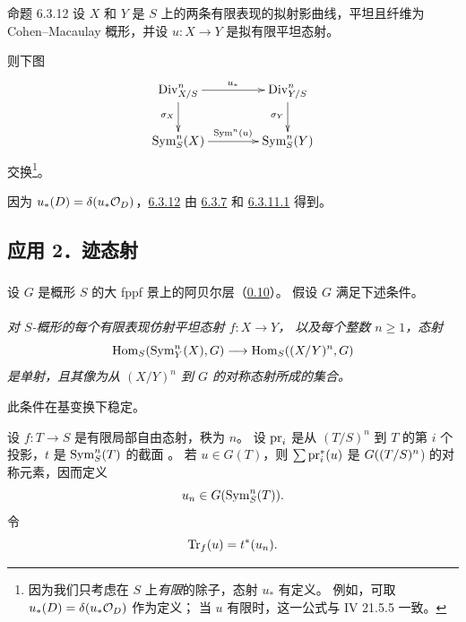 \begin{enonce*}{命题 6.3.12}
设 $X$ 和 $Y$ 是 $S$ 上的两条有限表现的拟射影曲线，平坦且纤维为
Cohen--Macaulay 概形，并设 $u:X\rightarrow Y$ 是拟有限平坦态射。

则下图
\[
\xymatrix@C=4em{
\sheaf{\Div}^{n}_{X/S}  \ar[r]^{u_{\ast}} \ar[d]_{\sigma_X} &
\sheaf{\Div}^{n}_{Y/S} \ar[d]_{\sigma_Y}\\
\Sym^{n}_S(X)     \ar[r]^{\Sym^{n}(u)} & \Sym^{n}_S(Y)
}
\]
交换\footnote[1]{\label{XVII.note192}
因为我们只考虑在 $S$ 上\emph{有限}的除子，态射 $u_{\ast}$ 有定义。
例如，可取 $u_{\ast}(D)=\delta(u_{\ast}{\mathcal O}_{D})$ 作为定义；
当 $u$ 有限时，这一公式与 \EGA IV 21.5.5 一致。}。
\end{enonce*}

\sisi{\noindent}{}%
因为 $u_{\ast}(D)=\delta(u_{\ast}{\mathcal O}_{D})$，\hyperref[XVII.prop6.3.12]{6.3.12}
由 \hyperref[XVII.prop6.3.7]{6.3.7} 和 \hyperref[XVII.prop6.3.11.1]{6.3.11.1} 得到。

\subsection*{应用 2．迹态射}

\setcounter{subsubsection}{12}
\subsubsection{}
设 $G$ 是概形 $S$ 的大 fppf 景上的阿贝尔层（\hyperref[XVII.subsec0.10]{0.10}）。
假设 $G$ 满足下述条件。

\paragraph{}
\emph{对 $S$-概形的每个有限表现仿射平坦态射 $f:X\rightarrow Y$，
以及每个整数 $n\geq 1$，态射}
\[
\operatorname{Hom}_{S}(\operatorname{Sym}^{n}_{Y}(X),G)\longrightarrow \operatorname{Hom}_{S}((X/Y)^{n},G)
\]
\emph{是\pageoriginale 单射，且其像为从 $(X/Y)^{n}$ 到 $G$ 的对称态射所成的集合。}

此条件在基变换下稳定。

设 $f:T\rightarrow S$ 是有限局部自由态射，秩为 $n$。
设 $\operatorname{pr}_{i}$ 是从 $(T/S)^{n}$ 到 $T$ 的第 $i$ 个投影，$t$ 是
$\operatorname{Sym}^{n}_{S}(T)$ 的截面 。
若 $u\in G(T)$，则 $\sum \operatorname{pr}^{\ast}_{i}(u)$ 是
$G((T/S)^{n}$) 的对称元素，因而定义
\[
u_{n}\in G(\operatorname{Sym}^{n}_{S}(T)){}.
\]
令
\[
\operatorname{Tr}_{f}(u)=t^{\ast}(u_{n}){}.
\]

